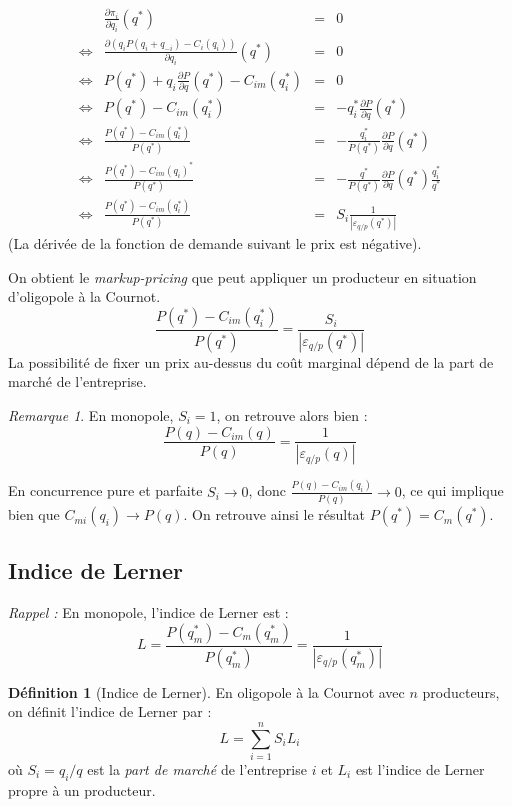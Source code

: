 \documentclass[
]{book}
\theoremstyle{definition}
\newtheorem{definition}{Définition}[chapter]
\theoremstyle{definition}
\theoremstyle{definition}
\theoremstyle{definition}
\theoremstyle{remark}
\newtheorem*{remark}{Remarque}
\begin{document}
\[
\begin{array}{crcl}
&\frac{\partial \pi_i}{\partial q_i}(q^*) &=& 0\\
\Leftrightarrow & \frac{\partial  \left(q_iP(q_i+q_{-i}) -C_i(q_i)\right)}{\partial q_i}(q^*) &= &0\\
\Leftrightarrow & P(q^*) + q_i\frac{\partial  P}{\partial q}(q^*) -C_{im}(q_i^*)&= &0\\
\Leftrightarrow & P(q^*) - C_{im}(q_i^*)&= &-q_i^*\frac{\partial  P}{\partial q}(q^*) \\
\Leftrightarrow & \frac{P(q^*)-C_{im}(q_i^*)}{P(q^*)}&= &-\frac{q_i^*}{P(q^*)}\frac{\partial  P}{\partial q}(q^*) \\
\Leftrightarrow & \frac{P(q^*) -C_{im}(q_i)^*}{P(q^*)}&= &-\frac{q^*}{P(q^*)}\frac{\partial  P}{\partial q}(q^*)\frac{q_i^*}{q^*} \\
\Leftrightarrow & \frac{P(q^*) - C_{im}(q_i^*)}{P(q^*)}&= &S_i\frac{1}{\left|\varepsilon_{q/p}(q^*)\right|}
\end{array}
\]
(La dérivée de la fonction de demande suivant le prix est négative).

On obtient le \emph{markup-pricing} que peut appliquer un producteur en situation d'oligopole à la Cournot.
\[\frac{P(q^*) -C_{im}(q_i^*)}{P(q^*)}= \frac{S_i}{\left|\varepsilon_{q/p}(q^*)\right|}\]
La possibilité de fixer un prix au-dessus du coût marginal dépend de la part de marché de l'entreprise.

\begin{remark}
En monopole, \(S_i=1\), on retrouve alors bien :
\[\frac{P(q) -C_{im}(q)}{P(q)}= \frac{1}{\left|\varepsilon_{q/p}(q)\right|}\]

En concurrence pure et parfaite \(S_i\to 0\), donc \(\frac{P(q) -C_{im}(q_i)}{P(q)}\to 0\), ce qui implique bien que \(C_{mi}(q_i)\to P(q)\).
On retrouve ainsi le résultat \(P(q^*)=C_m(q^*)\).
\end{remark}

\hypertarget{indice-de-lerner}{%
\subsection{Indice de Lerner}\label{indice-de-lerner}}

\emph{Rappel :} En monopole, l'indice de Lerner est :
\[L=\frac{P(q_m^*)-C_m(q_m^*)}{P(q_m^*)} = \frac{1}{\left|\varepsilon_{q/p}(q_m^*)\right|}\]

\begin{definition}[Indice de Lerner]
En oligopole à la Cournot avec \(n\) producteurs, on définit l'indice de Lerner par :
\[L = \sum_{i=1}^nS_iL_i\]
où \(S_i=q_i/q\) est la \emph{part de marché} de l'entreprise \(i\) et \(L_i\) est l'indice de Lerner propre à un producteur.
\end{definition}
\end{document}
